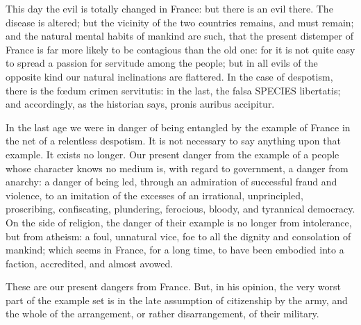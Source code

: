 This day the evil is totally changed in France: but there is an evil there. The disease is altered; but the vicinity of the two countries remains, and must remain; and the natural mental habits of mankind are such, that the present distemper of France is far more likely to be contagious than the old one: for it is not quite easy to spread a passion for servitude among the people; but in all evils of the opposite kind our natural inclinations are flattered. In the case of despotism, there is the fœdum crimen servitutis: in the last, the falsa SPECIES libertatis; and accordingly, as the historian says, pronis auribus accipitur.

In the last age we were in danger of being entangled by the example of France in the net of a relentless despotism. It is not necessary to say anything upon that example. It exists no longer. Our present danger from the example of a people whose character knows no medium is, with regard to government, a danger from anarchy: a danger of being led, through an admiration of successful fraud and violence, to an imitation of the excesses of an irrational, unprincipled, proscribing, confiscating, plundering, ferocious, bloody, and tyrannical democracy. On the side of religion, the danger of their example is no longer from intolerance, but from atheism: a foul, unnatural vice, foe to all the dignity and consolation of mankind; which seems in France, for a long time, to have been embodied into a faction, accredited, and almost avowed.

These are our present dangers from France. But, in his opinion, the very worst part of the example set is in the late assumption of citizenship by the army, and the whole of the arrangement, or rather disarrangement, of their military.

